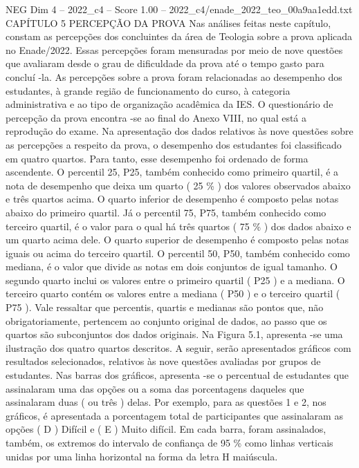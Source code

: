 \begin{textsample}{NEG Dim 4 – 2022\_c4 – Score 1.00 – 2022\_c4/enade\_2022\_teo\_00a9aa1edd.txt}  \label{ex:f4_neg_216}
CAPÍTULO 5 PERCEPÇÃO DA PROVA Nas análises feitas neste capítulo, constam as percepções dos concluintes da área de Teologia sobre a prova aplicada no Enade/2022.
Essas percepções foram mensuradas por meio de nove questões que avaliaram desde o grau de dificuldade da prova até o tempo gasto para concluí -la.
As percepções sobre a prova foram relacionadas ao desempenho dos estudantes, à grande região de funcionamento do curso, à categoria administrativa e ao tipo de organização acadêmica da IES.
O questionário de percepção da prova encontra -se ao final do Anexo VIII, no qual está a reprodução do exame.
Na apresentação dos dados relativos às nove questões sobre as percepções a respeito da prova, o desempenho dos estudantes foi classificado em quatro quartos.
Para tanto, esse desempenho foi ordenado de forma ascendente.
O percentil 25, P25, também conhecido como primeiro quartil, é a nota de desempenho que deixa um quarto ( 25 \% ) dos valores observados abaixo e três quartos acima.
O quarto inferior de desempenho é composto pelas notas abaixo do primeiro quartil.
Já o percentil 75, P75, também conhecido como terceiro quartil, é o valor para o qual há três quartos ( 75 \% ) dos dados abaixo e um quarto acima dele.
O quarto superior de desempenho é composto pelas notas iguais ou acima do terceiro quartil.
O percentil 50, P50, também conhecido como mediana, é o valor que divide as notas em dois conjuntos de igual tamanho.
O segundo quarto inclui os valores entre o primeiro quartil ( P25 ) e a mediana.
O terceiro quarto contém os valores entre a mediana ( P50 ) e o terceiro quartil ( P75 ).
Vale ressaltar que percentis, quartis e medianas são pontos que, não obrigatoriamente, pertencem ao conjunto original de dados, ao passo que os quartos são subconjuntos dos dados originais.
Na Figura 5.1, apresenta -se uma ilustração dos quatro quartos descritos.
A seguir, serão apresentados gráficos com resultados selecionados, relativos às nove questões avaliadas por grupos de estudantes.
Nas barras dos gráficos, apresenta -se o percentual de estudantes que assinalaram uma das opções ou a soma das porcentagens daqueles que assinalaram duas ( ou três ) delas.
Por exemplo, para as questões 1 e 2, nos gráficos, é apresentada a porcentagem total de participantes que assinalaram as opções ( D ) Difícil e ( E ) Muito difícil.
Em cada barra, foram assinalados, também, os extremos do intervalo de confiança de 95 \% como linhas verticais unidas por uma linha horizontal na forma da letra H maiúscula.

\end{textsample}
